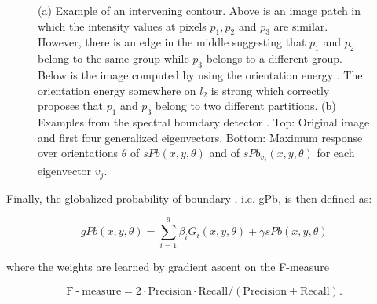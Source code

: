 \documentclass{SMBV12}
\begin{document}
\begin{figure}[htbp]
    \centering
    \caption{(a) Example of an intervening contour. Above is an image patch in which the intensity values at pixels $p_1, p_2$ and $p_3$ are similar. However, there is an edge in the middle suggesting that $p_1$ and $p_2$ belong to the same group while $p_3$ belongs to a different group. Below is the image computed by using the orientation energy \cite{leung1998contour}. The orientation energy somewhere on $l_2$ is strong which correctly proposes that $p_1$ and $p_3$ belong to two different partitions. (b) Examples from the spectral boundary detector \cite{maire2008using}. Top: Original image and first four generalized eigenvectors. Bottom: Maximum response over orientations $\theta$ of $sPb(x, y, \theta)$ and of $sPb_{v_j}(x, y, \theta)$ for each eigenvector $v_j$.}
\end{figure}

Finally, the globalized probability of boundary , i.e. gPb, is then defined as:

\begin{equation}
gPb(x, y, \theta) = \sum\limits_{i = 1}^{9}\beta_i G_i(x, y, \theta) + \gamma sPb(x, y, \theta)
\end{equation}

where the weights are learned by gradient ascent on the F-measure

\begin{equation}
\mathrm{F} \operatorname{-} \mathrm{measure} = 2\cdot \mathrm{Precision} \cdot \mathrm{Recall}/(\mathrm{Precision + Recall}).
\end{equation} 
\end{document}
